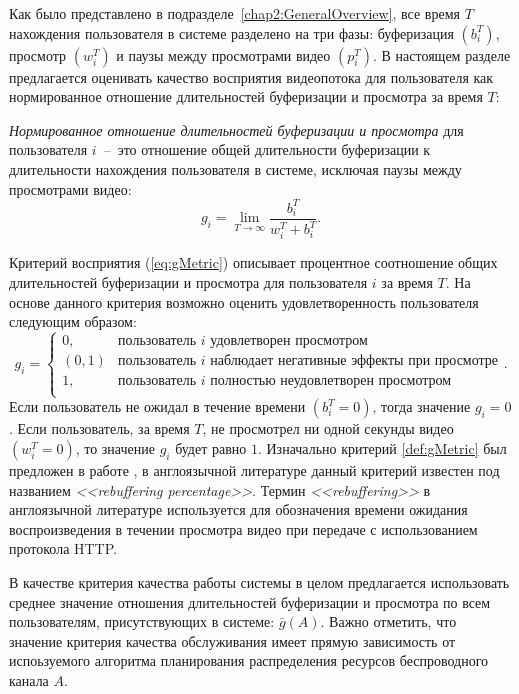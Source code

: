 Как было представлено в подразделе~\ref{chap2:GeneralOverview}, все время $T$ нахождения пользователя в системе разделено на три фазы: буферизация $\left( b_i^T \right)$, просмотр $\left( w_i^T \right)$ и паузы между просмотрами видео $\left( p_i^T \right)$. В настоящем разделе предлагается оценивать качество восприятия видеопотока для пользователя как нормированное отношение длительностей буферизации и просмотра за время $T$:
\begin{definition}
\label{def:gMetric}
    \emph{Нормированное отношение длительностей буферизации и просмотра} для пользователя $i$~--~это отношение общей длительности буферизации к длительности нахождения пользователя в системе, исключая паузы между просмотрами видео:
    \emph{
    \begin{equation}
    	\label{eq:gMetric}
		g_i = \lim\limits_{T\rightarrow\infty} \frac{b_i^T}{w_i^T + b_i^T}.
	\end{equation}
	}
\end{definition}

Критерий восприятия (\ref{eq:gMetric}) описывает процентное соотношение общих длительностей буферизации и просмотра для пользователя $i$ за время $T$. На основе данного критерия возможно оценить удовлетворенность пользователя следующим образом:
$$g_i=
\begin{cases}
0, & \text{пользователь $i$ удовлетворен просмотром}\\
(0,1) & \text{пользователь $i$ наблюдает негативные эффекты при просмотре}\\
1, & \text{пользователь $i$ полностью неудовлетворен просмотром}\\
\end{cases}.
$$
Если пользователь не ожидал в течение времени $\left(b_i^T = 0\right)$, тогда значение $g_i = 0$.
Если пользователь, за время $T$, не просмотрел ни одной секунды видео $\left(w_i^T = 0\right)$, то значение $g_i$ будет равно $1$. Изначально критерий \ref{def:gMetric} был предложен в работе \cite{QoE_enhancement}, в англоязычной литературе данный критерий известен под названием \textit{<<rebuffering percentage>>}. Термин \textit{<<rebuffering>>} в англоязычной литературе используется для обозначения времени ожидания воспроизведения в течении просмотра видео при передаче с использованием протокола HTTP.

В качестве критерия качества работы системы в целом предлагается использовать среднее значение отношения длительностей буферизации и просмотра по всем пользователям, присутствующих в системе: $\bar{g}\left(A\right)$. Важно отметить, что значение критерия качества обслуживания имеет прямую зависимость от испоьзуемого алгоритма планирования распределения ресурсов беспроводного канала $A$.

